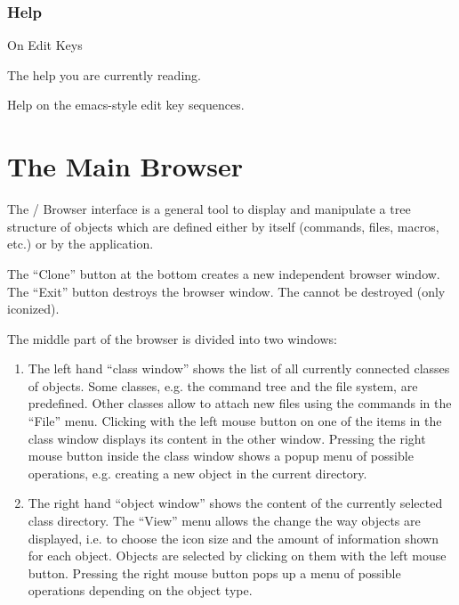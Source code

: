 \subsubsection{Help}
\begin{DLsf}{On Edit Keys}
\item[On Kxterm]
         The help you are currently reading.
\item[On Edit Keys]
         Help on the emacs-style edit key sequences.
\end{DLsf}

\section{The Main Browser}

The \KUIP/\MOTIF{} Browser interface is a general tool to display and
manipulate a tree structure of objects which are defined either by \KUIP{}
itself (commands, files, macros, etc.) or by the application.

The ``Clone'' button at the bottom creates a new independent browser window.
The ``Exit'' button destroys the browser window. The \MB{} cannot be
destroyed (only iconized).

The middle part of the browser is divided into two windows:

\begin{enumerate}
\item The left hand ``class window'' shows the list of all currently connected
   classes of objects.  Some classes, e.g. the command tree and the file
   system, are predefined.  Other classes allow to attach new files using the
   commands in the ``File'' menu.  Clicking with the left mouse button on
   one of
   the items in the class window displays its content in the other window.
   Pressing the right mouse button inside the class window shows a popup menu
   of possible operations, e.g. creating a new object in the current
   directory.

\item The right hand ``object window'' shows the content of the currently
   selected class directory.  The ``View'' menu allows the change the way
   objects are displayed, i.e. to choose the icon size and the amount of
   information shown for each object.  Objects are selected by clicking on
   them with the left mouse button.  Pressing the right mouse button pops up a
   menu of possible operations depending on the object type.
\end{enumerate}

